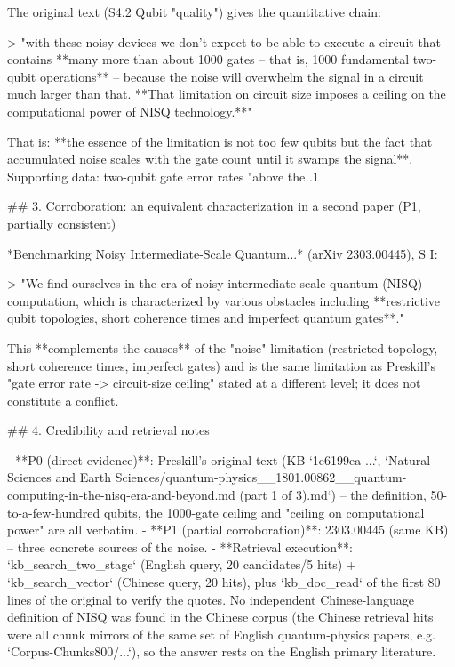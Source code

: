 \documentclass[10pt]{article}
\begin{document}
\begin{AnswerText}
The original text (S4.2 Qubit "quality") gives the quantitative chain:

> "with these noisy devices we don't expect to be able to execute a circuit that contains **many more than about 1000 gates -- that is, 1000 fundamental two-qubit operations** -- because the noise will overwhelm the signal in a circuit much larger than that. **That limitation on circuit size imposes a ceiling on the computational power of NISQ technology.**"

That is: **the essence of the limitation is not too few qubits but the fact that accumulated noise scales with the gate count until it swamps the signal**. Supporting data: two-qubit gate error rates "above the .1%

## 3. Corroboration: an equivalent characterization in a second paper (P1, partially consistent)

*Benchmarking Noisy Intermediate-Scale Quantum...* (arXiv 2303.00445), S I:

> "We find ourselves in the era of noisy intermediate-scale quantum (NISQ) computation, which is characterized by various obstacles including **restrictive qubit topologies, short coherence times and imperfect quantum gates**."

This **complements the causes** of the "noise" limitation (restricted topology, short coherence times, imperfect gates) and is the same limitation as Preskill's "gate error rate -> circuit-size ceiling" stated at a different level; it does not constitute a conflict.

## 4. Credibility and retrieval notes

- **P0 (direct evidence)**: Preskill's original text (KB `1e6199ea-...`, `Natural Sciences and Earth Sciences/quantum-physics__1801.00862__quantum-computing-in-the-nisq-era-and-beyond.md (part 1 of 3).md`) -- the definition, 50-to-a-few-hundred qubits, the 1000-gate ceiling and "ceiling on computational power" are all verbatim.
- **P1 (partial corroboration)**: 2303.00445 (same KB) -- three concrete sources of the noise.
- **Retrieval execution**: `kb_search_two_stage` (English query, 20 candidates/5 hits) + `kb_search_vector` (Chinese query, 20 hits), plus `kb_doc_read` of the first 80 lines of the original to verify the quotes. No independent Chinese-language definition of NISQ was found in the Chinese corpus (the Chinese retrieval hits were all chunk mirrors of the same set of English quantum-physics papers, e.g. `Corpus-Chunks800/...`), so the answer rests on the English primary literature.
\end{AnswerText}
\end{document}
